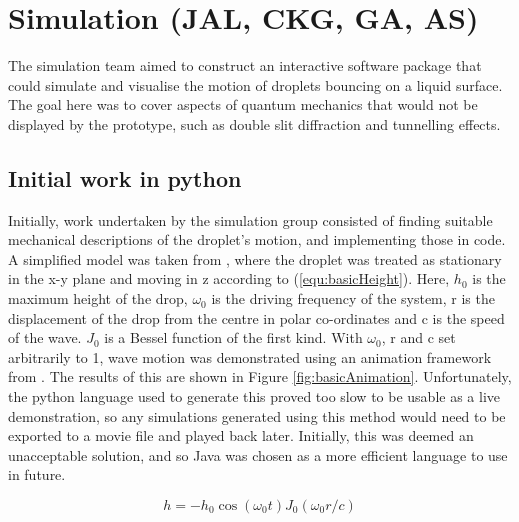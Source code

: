 \section{Simulation (JAL, CKG, GA, AS)}
The simulation team aimed to construct an interactive software package that could simulate and visualise the motion of droplets bouncing on a liquid surface. The goal here was to cover aspects of quantum mechanics that would not be displayed by the prototype, such as double slit diffraction and tunnelling effects.
\subsection{Initial work in python}
Initially, work undertaken by the simulation group consisted of finding suitable mechanical descriptions of the droplet's motion, and implementing those in code. A simplified model was taken from \cite{brady2014bouncing}, where the droplet was treated as stationary in the x-y plane and moving in z according to (\ref{equ:basicHeight}). Here, $h_0$ is the maximum height of the drop, $\omega_0$ is the driving frequency of the system, r is the displacement of the drop from the centre in polar co-ordinates and c is the speed of the wave. $J_0$ is a Bessel function of the first kind. With $\omega_0$, r and c set arbitrarily to 1, wave motion was demonstrated using an animation framework from \cite{waveanimation}. The results of this are shown in Figure \ref{fig:basicAnimation}. Unfortunately, the python language used to generate this proved too slow to be usable as a live demonstration, so any simulations generated using this method would need to be exported to a movie file and played back later. Initially, this was deemed an unacceptable solution, and so Java was chosen as a more efficient language to use in future.

\begin{equation}
    h = -h_0 \cos{(\omega_0 t)} J_0 (\omega_0 r/c)
    \label{equ:basicHeight}
\end{equation}

